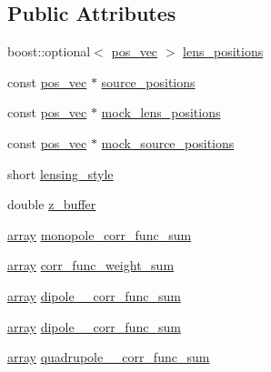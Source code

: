 \subsection*{Public Attributes}
\begin{DoxyCompactItemize}
\item 
boost\+::optional$<$ \hyperlink{structcorr__func__bin_a683c7075740b3dcae9ebb1ac758c0bfa}{pos\+\_\+vec} $>$ \hyperlink{structcorr__func__bin_afa9c5927c01bf7e14184ac04343cf1fc}{lens\+\_\+positions}
\item 
const \hyperlink{structcorr__func__bin_a683c7075740b3dcae9ebb1ac758c0bfa}{pos\+\_\+vec} $\ast$ \hyperlink{structcorr__func__bin_a6bf79ee0d0e960fb9d909869cd76ac04}{source\+\_\+positions}
\item 
const \hyperlink{structcorr__func__bin_a683c7075740b3dcae9ebb1ac758c0bfa}{pos\+\_\+vec} $\ast$ \hyperlink{structcorr__func__bin_ae856cc01cc5f5b4a0e78865e29f1872d}{mock\+\_\+lens\+\_\+positions}
\item 
const \hyperlink{structcorr__func__bin_a683c7075740b3dcae9ebb1ac758c0bfa}{pos\+\_\+vec} $\ast$ \hyperlink{structcorr__func__bin_abad4ec4b0d9b164e00f58c0caa28fb8b}{mock\+\_\+source\+\_\+positions}
\item 
short \hyperlink{structcorr__func__bin_a65d8550c1986a01d457c96280f1f0cee}{lensing\+\_\+style}
\item 
double \hyperlink{structcorr__func__bin_a84d10388283c2977e9338534303e355b}{z\+\_\+buffer}
\item 
\hyperlink{structcorr__func__bin_a266e654606807bf423b915c6ef9ff7ab}{array} \hyperlink{structcorr__func__bin_af930e7039de00d0c73dfcb6f6a24c25b}{monopole\+\_\+corr\+\_\+func\+\_\+sum}
\item 
\hyperlink{structcorr__func__bin_a266e654606807bf423b915c6ef9ff7ab}{array} \hyperlink{structcorr__func__bin_aa8da5da871a5bc83c19a11fabf7061f4}{corr\+\_\+func\+\_\+weight\+\_\+sum}
\item 
\hyperlink{structcorr__func__bin_a266e654606807bf423b915c6ef9ff7ab}{array} \hyperlink{structcorr__func__bin_a68c613176dafabef7c1b0b617867d8e7}{dipole\+\_\+\_\+corr\+\_\+func\+\_\+sum}
\item 
\hyperlink{structcorr__func__bin_a266e654606807bf423b915c6ef9ff7ab}{array} \hyperlink{structcorr__func__bin_accf926a9793c65672206befc997e55f7}{dipole\+\_\+\_\+corr\+\_\+func\+\_\+sum}
\item 
\hyperlink{structcorr__func__bin_a266e654606807bf423b915c6ef9ff7ab}{array} \hyperlink{structcorr__func__bin_ac0e011470789b147de20bbe457a65716}{quadrupole\+\_\+\_\+corr\+\_\+func\+\_\+sum}

\end{DoxyCompactItemize}
